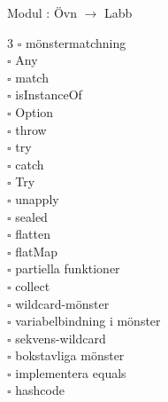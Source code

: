 
    Modul : Övn  $\rightarrow$ Labb 
    \begin{multicols}{3}\SlideFontTiny
    $\square$ mönstermatchning \\
$\square$ Any \\
$\square$ match \\
$\square$ isInstanceOf \\
$\square$ Option \\
$\square$ throw \\
$\square$ try \\
$\square$ catch \\
$\square$ Try \\
$\square$ unapply \\
$\square$ sealed \\
$\square$ flatten \\
$\square$ flatMap \\
$\square$ partiella funktioner \\
$\square$ collect \\
$\square$ wildcard-mönster \\
$\square$ variabelbindning i mönster \\
$\square$ sekvens-wildcard \\
$\square$ bokstavliga mönster \\
$\square$ implementera equals \\
$\square$ hashcode \\
    \end{multicols}
    